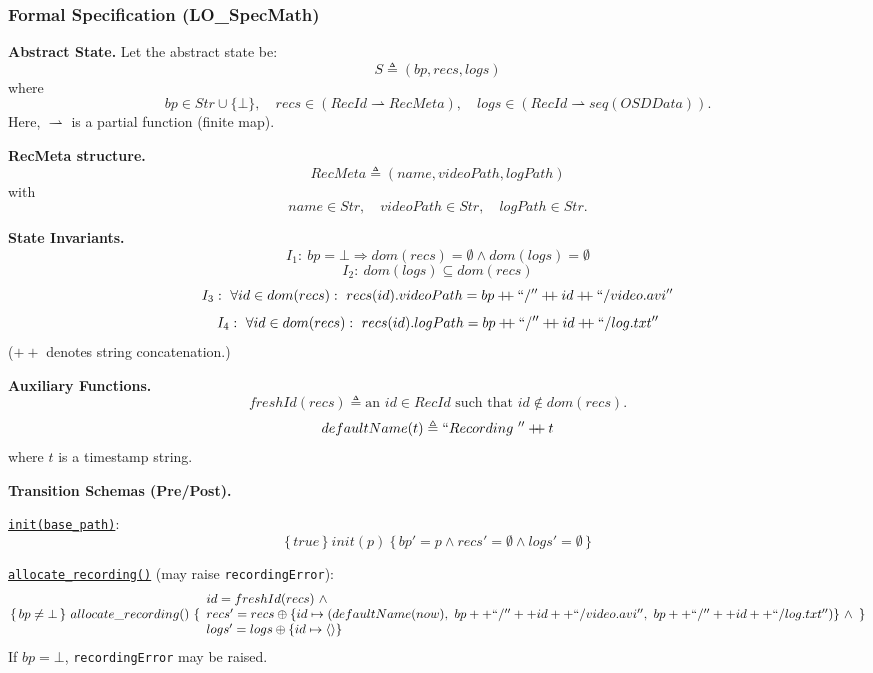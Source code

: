 \documentclass[12pt, titlepage]{article}
\begin{document}
\subsubsection{Formal Specification (LO\_SpecMath)}

\noindent\textbf{Abstract State.}
Let the abstract state be:
\[
  S \triangleq (bp, recs, logs)
\]
where
\[
  bp \in Str \cup \{\bot\},
  \quad
  recs \in (\textit{RecId} \rightharpoonup \textit{RecMeta}),
  \quad
  logs \in (\textit{RecId} \rightharpoonup seq(OSDData)).
\]
Here, \(\rightharpoonup\) is a partial function (finite map).

\noindent\textbf{RecMeta structure.}
\[
  \textit{RecMeta} \triangleq (name, videoPath, logPath)
\]
with
\[
  name \in Str,\quad videoPath \in Str,\quad logPath \in Str.
\]

\noindent\textbf{State Invariants.}
\[
  I_1:\ bp = \bot \Rightarrow dom(recs)=\emptyset \land dom(logs)=\emptyset
\]
\[
  I_2:\ dom(logs) \subseteq dom(recs)
\]
\[
  I_3:\ \forall id \in dom(recs):\ recs(id).videoPath = bp \mathbin{+\!\!+} ``/'' \mathbin{+\!\!+} id \mathbin{+\!\!+} ``/video.avi''
\]
\[
  I_4:\ \forall id \in dom(recs):\ recs(id).logPath = bp \mathbin{+\!\!+} ``/'' \mathbin{+\!\!+} id \mathbin{+\!\!+} ``/log.txt''
\]
(\(+\!\!+\) denotes string concatenation.)

\noindent\textbf{Auxiliary Functions.}
\[
  freshId(recs) \triangleq \text{an } id \in \textit{RecId} \text{ such that } id \notin dom(recs).
\]
\[
  defaultName(t) \triangleq ``Recording\ '' \mathbin{+\!\!+} t
\]
where \(t\) is a timestamp string.

\noindent\textbf{Transition Schemas (Pre/Post).}

\noindent\underline{\texttt{init(base\_path)}}:
\[
  \{\, true \,\}\ init(p)\ \{\, bp' = p \land recs'=\emptyset \land logs'=\emptyset \,\}
\]

\noindent\underline{\texttt{allocate\_recording()}} (may raise \texttt{recordingError}):
\[
  \{\, bp \neq \bot \,\}\ allocate\_recording()\ \{
  \begin{array}{l}
    id = freshId(recs) \ \land                                                                                                    \\
    recs' = recs \oplus \{ id \mapsto (defaultName(now),\ bp++``/''++id++``/video.avi'',\ bp++``/''++id++``/log.txt'') \} \ \land \\
    logs' = logs \oplus \{ id \mapsto \langle \rangle \}
  \end{array}
  \}
\]
If \(bp=\bot\), \texttt{recordingError} may be raised.
\end{document}
